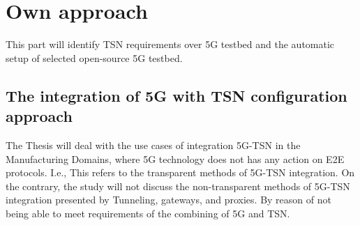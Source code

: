 \section{\textbf{Own approach }}\label{sec:main}
 
 
This part will identify TSN requirements over 5G testbed and the automatic setup of selected open-source 5G testbed.
 \subsection{The integration of 5G with TSN configuration approach}
 
The Thesis will deal with the use cases of integration 5G-TSN  in the Manufacturing Domains, where 5G technology does not has any action on  E2E protocols. I.e., This refers to the transparent methods of 5G-TSN integration\cite{Neumann2018}. On the contrary, the study will not discuss the non-transparent methods of 5G-TSN integration presented by Tunneling, gateways, and proxies. By reason of not being able to meet requirements of the combining of 5G and TSN.

